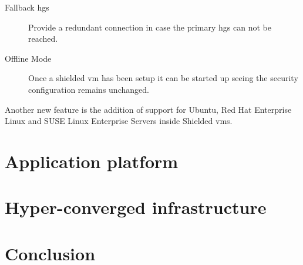 \begin{description}
	\item[Fallback \acrshort{hgs}] Provide a redundant connection in case the primary \acrshort{hgs} can not be reached.
	\item[Offline Mode] Once a shielded \acrshort{vm} has been setup it can be started up seeing the security configuration remains unchanged.
\end{description}

Another new feature is the addition of support for Ubuntu, Red Hat Enterprise Linux and SUSE Linux Enterprise Servers inside Shielded \acrshort{vm}s. 

\section{Application platform}

\section{Hyper-converged infrastructure}
\section{Conclusion}
